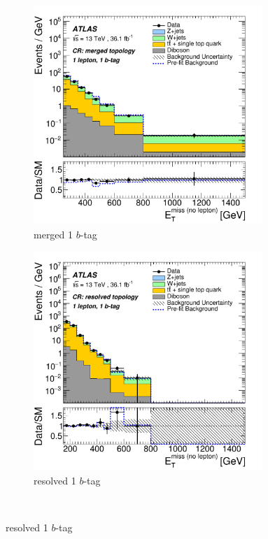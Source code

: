 \begin{figure}[htbp]
\begin{subfigure}{0.45\textwidth}
    \centering
    \includegraphics[width=0.95\textwidth]{figures/monoV/results/figaux_08c.pdf}
    \caption{merged 1 \(b\)-tag}
  \end{subfigure}
    \begin{subfigure}{0.45\textwidth}
    \centering
    \includegraphics[width=0.95\textwidth]{figures/monoV/results/figaux_08d.pdf}
    \caption{resolved 1 \(b\)-tag}
  \end{subfigure} \\


\end{figure}
